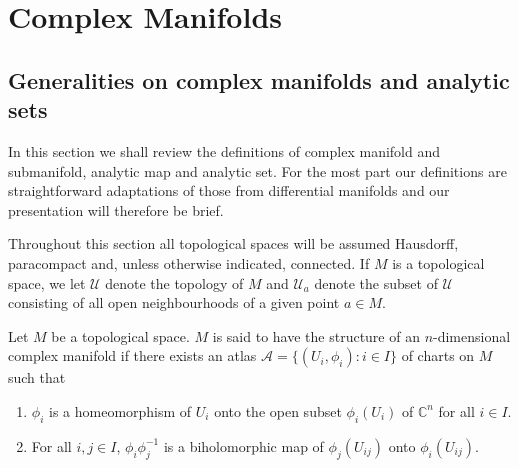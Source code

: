 \chapter{Complex Manifolds}\label{ch:4}
\ChapterFourIntroduction

\section{Generalities on complex manifolds and analytic sets}\label{sec:4:1}
In this section we shall review the definitions of complex manifold and submanifold, analytic map and analytic set. For the most part our definitions are straightforward adaptations of those from differential manifolds and our presentation will therefore be brief.

Throughout this section all topological spaces will be assumed Hausdorff, paracompact and, unless otherwise indicated, connected. If $M$ is a topological space, we let $\mathcal U$ denote the topology of $M$ and $\mathcal U_a$ denote the subset of $\mathcal U$ consisting of all open neighbourhoods of a given point $a\in M$.

 Let $M$ be a topological space. $M$ is said to have the structure of an $n$-dimensional complex manifold if there exists an atlas $\mathcal A=\{(U_i,\phi_i):i\in I\}$ of charts on $M$ such that
\begin{enumerate}
\item $\phi_i$ is a homeomorphism of $U_i$ onto the open subset $\phi_i(U_i)$ of $\mathbb C^n$ for all $i\in I$.
\item For all $i,j\in I$, $\phi_i\phi_j^{-1}$ is a biholomorphic map of $\phi_j(U_{ij})$ onto $\phi_i(U_{ij})$.
\end{enumerate}

